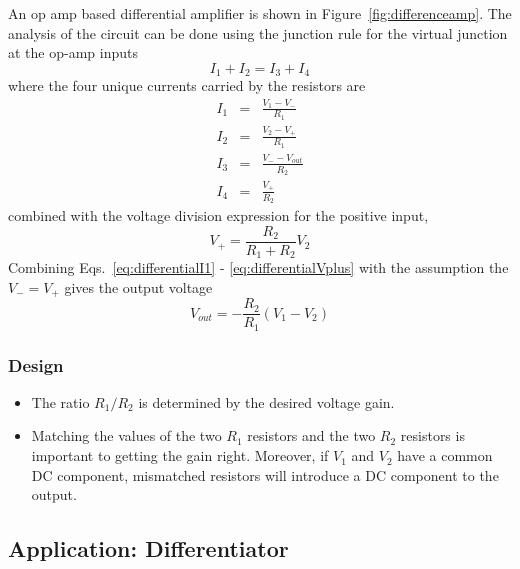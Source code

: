 \documentclass[11pt]{article}
\begin{document}
An op amp based differential amplifier is shown in
Figure~\ref{fig:differenceamp}. The analysis of the circuit can be
done using the junction rule for the virtual junction at the
op-amp inputs
\begin{equation}
  I_1 + I_2 = I_3 + I_4
\end{equation}
where the four unique currents carried by the resistors are
\begin{eqnarray}
  \label{eq:differentialI1}
  I_1 &=& \frac{V_1 - V_-}{R_1}\\
  I_2 &=& \frac{V_2 - V_+}{R_1}\\
  I_3 &=& \frac{V_- - V_{out}}{R_2}\\
  I_4 &=& \frac{V_+}{R_2}
\end{eqnarray}
combined with the voltage division expression for the positive input,
\begin{equation}
  \label{eq:differentialVplus}
  V_+ = \frac{R_2}{R_1 + R_2} V_2
\end{equation}
Combining Eqs.~\ref{eq:differentialI1} - \ref{eq:differentialVplus}
with the assumption the $V_- = V_+$ gives the output voltage 
\begin{equation}
  V_{out} = - \frac{R_2}{R_1} \left(V_1 - V_2\right)
\end{equation}

\subsubsection*{Design}
\begin{itemize}
\item The ratio $R_1/R_2$ is determined by the desired voltage gain.

\item Matching the values of the two $R_1$ resistors and the two $R_2$
  resistors is important to getting the gain right. Moreover, if $V_1$
  and $V_2$ have a common DC component, mismatched resistors will
  introduce a DC component to the output.

\end{itemize}

\subsection{Application: Differentiator}
\label{sec:differentiator}
\end{document}
